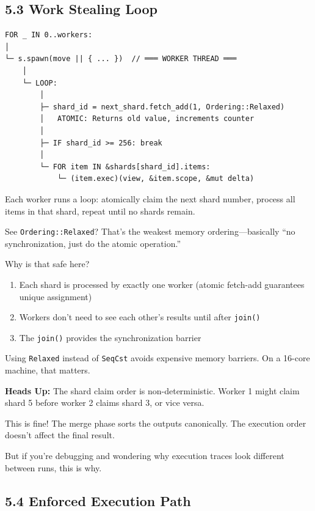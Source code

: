 \documentclass[11pt]{book}
\newenvironment{directors}
{\begin{mdframed}[
  linecolor=blue!60,
  linewidth=2pt,
  leftline=true,
  rightline=false,
  topline=false,
  bottomline=false,
  backgroundcolor=blue!3,
  innerleftmargin=12pt,
  innerrightmargin=10pt,
  innertopmargin=8pt,
  innerbottommargin=8pt,
  skipabove=12pt,
  skipbelow=12pt
]\small\sffamily\color{blue!70!black}}
{\end{mdframed}}
\newenvironment{watchout}
{\begin{mdframed}[
  linecolor=orange!80!black,
  linewidth=2pt,
  leftline=true,
  rightline=false,
  topline=false,
  bottomline=false,
  backgroundcolor=orange!5,
  innerleftmargin=12pt,
  innerrightmargin=10pt,
  innertopmargin=8pt,
  innerbottommargin=8pt,
  skipabove=12pt,
  skipbelow=12pt
]\small\sffamily\color{orange!70!black}\textbf{Heads Up:} }
{\end{mdframed}}
\begin{document}
\subsection{5.3 Work Stealing Loop}

\begin{verbatim}
FOR _ IN 0..workers:
│
└─ s.spawn(move || { ... })  // ═══ WORKER THREAD ═══
    │
    └─ LOOP:
        │
        ├─ shard_id = next_shard.fetch_add(1, Ordering::Relaxed)
        │   ATOMIC: Returns old value, increments counter
        │
        ├─ IF shard_id >= 256: break
        │
        └─ FOR item IN &shards[shard_id].items:
            └─ (item.exec)(view, &item.scope, &mut delta)
\end{verbatim}

\begin{directors}
Each worker runs a loop: atomically claim the next shard number, process all items in that shard, repeat until no shards remain.

See \texttt{Ordering::Relaxed}? That's the weakest memory ordering---basically ``no synchronization, just do the atomic operation.''

Why is that safe here?
\begin{enumerate}
\item Each shard is processed by exactly one worker (atomic fetch-add guarantees unique assignment)
\item Workers don't need to see each other's results until after \texttt{join()}
\item The \texttt{join()} provides the synchronization barrier
\end{enumerate}

Using \texttt{Relaxed} instead of \texttt{SeqCst} avoids expensive memory barriers. On a 16-core machine, that matters.
\end{directors}

\begin{watchout}
The shard claim order is non-deterministic. Worker 1 might claim shard 5 before worker 2 claims shard 3, or vice versa.

This is fine! The merge phase sorts the outputs canonically. The execution order doesn't affect the final result.

But if you're debugging and wondering why execution traces look different between runs, this is why.
\end{watchout}

\subsection{5.4 Enforced Execution Path}\label{enforced-execution-path}
\end{document}
